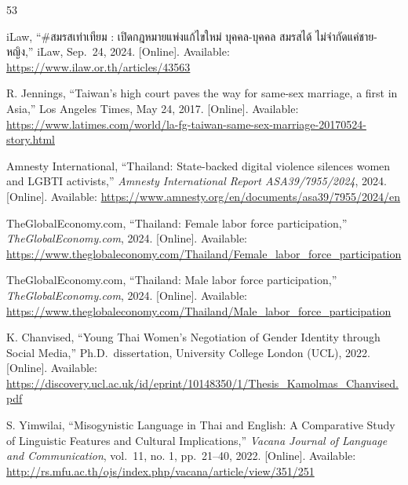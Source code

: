 \documentclass[12pt,oneside,openright,a4paper]{cpe-english-project}
\begin{document}
\begin{thebibliography}{53}

\hypertarget{bib:ref1}{} iLaw, ``\#สมรสเท่าเทียม : เปิดกฎหมายแพ่งแก้ไขใหม่ บุคคล-บุคคล สมรสได้
ไม่จำกัดแค่ชาย-หญิง,'' iLaw, Sep.~24, 2024. {[}Online{]}. Available:
\href{https://www.ilaw.or.th/articles/43563?utm_source=chatgpt.com}{https://www.ilaw.or.th/articles/43563}

\hypertarget{bib:ref2}{} R. Jennings, ``Taiwan's high court paves the way for same-sex
marriage, a first in Asia,'' Los Angeles Times, May 24, 2017.
{[}Online{]}. Available:
\href{https://www.latimes.com/world/la-fg-taiwan-same-sex-marriage-20170524-story.html?utm_source=chatgpt.com}{https://www.latimes.com/world/la-fg-taiwan-same-sex-marriage-20170524-story.html}

\hypertarget{bib:ref3}{} Amnesty International, ``Thailand: State-backed digital violence
silences women and LGBTI activists,'' \emph{Amnesty International Report
ASA39/7955/2024}, 2024. {[}Online{]}. Available:
\href{https://www.amnesty.org/en/documents/asa39/7955/2024/en?utm_source=chatgpt.com}{https://www.amnesty.org/en/documents/asa39/7955/2024/en}

\hypertarget{bib:ref4}{} TheGlobalEconomy.com, ``Thailand: Female labor force
participation,'' \emph{TheGlobalEconomy.com}, 2024. {[}Online{]}.
Available:
\href{https://www.theglobaleconomy.com/Thailand/Female_labor_force_participation?utm_source=chatgpt.com}{https://www.theglobaleconomy.com/Thailand/Female\_labor\_force\_participation}

\hypertarget{bib:ref5}{} TheGlobalEconomy.com, ``Thailand: Male labor force
participation,'' \emph{TheGlobalEconomy.com}, 2024. {[}Online{]}.
Available:
\href{https://www.theglobaleconomy.com/Thailand/Male_labor_force_participation?utm_source=chatgpt.com}{https://www.theglobaleconomy.com/Thailand/Male\_labor\_force\_participation}

\hypertarget{bib:ref6}{} K. Chanvised, ``Young Thai Women's Negotiation of Gender
Identity through Social Media,'' Ph.D.~dissertation, University College
London (UCL), 2022. {[}Online{]}. Available:
\url{https://discovery.ucl.ac.uk/id/eprint/10148350/1/Thesis_Kamolmas_Chanvised.pdf}

\hypertarget{bib:ref7}{} S. Yimwilai, ``Misogynistic Language in Thai and English: A
Comparative Study of Linguistic Features and Cultural Implications,''
\emph{Vacana Journal of Language and Communication}, vol.~11, no. 1,
pp.~21--40, 2022. {[}Online{]}. Available:
\url{http://rs.mfu.ac.th/ojs/index.php/vacana/article/view/351/251}


\end{thebibliography}
\end{document}
